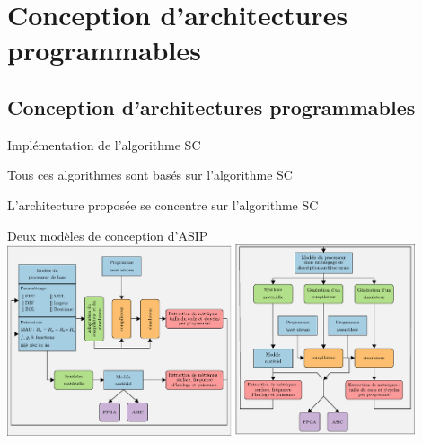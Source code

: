 

\section{Conception d'architectures programmables}



\subsection*{Conception d'architectures programmables}


\begin{frame}[c]{Implémentation de l'algorithme SC}
  \begin{table}[t]
    \centering
    {\small{}}
  \end{table}
  \vspace{0.5cm}
  \centering
  Tous ces algorithmes sont basés sur l'algorithme SC
  \vspace{0.7cm}

  L'architecture proposée se concentre sur l'algorithme SC
\end{frame}


\begin{frame}[c]{Deux modèles de conception d'ASIP}
  \centering
  \includegraphics[width=0.9\textwidth]{./fig/methodos}
\end{frame}


